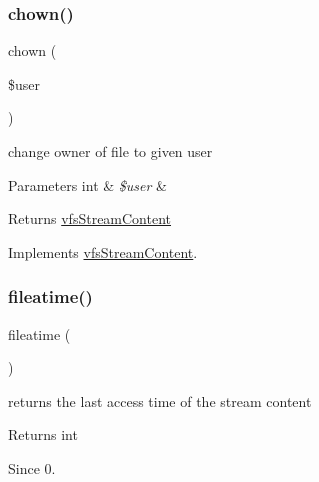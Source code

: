\subsubsection{\texorpdfstring{chown()}{chown()}}
{\footnotesize\ttfamily chown (\begin{DoxyParamCaption}\item[{}]{\$user }\end{DoxyParamCaption})}

change owner of file to given user


\begin{DoxyParams}[1]{Parameters}
int & {\em \$user} & \\
\hline
\end{DoxyParams}
\begin{DoxyReturn}{Returns}
\mbox{\hyperlink{interfaceorg_1_1bovigo_1_1vfs_1_1vfs_stream_content}{vfs\+Stream\+Content}} 
\end{DoxyReturn}


Implements \mbox{\hyperlink{interfaceorg_1_1bovigo_1_1vfs_1_1vfs_stream_content_adc7dd498252edfe9eef1bdb602edcbdb}{vfs\+Stream\+Content}}.

\mbox{\label{classorg_1_1bovigo_1_1vfs_1_1vfs_stream_abstract_content_a759a9858b5dea80fa68db2668df45ca0}} 
\subsubsection{\texorpdfstring{fileatime()}{fileatime()}}
{\footnotesize\ttfamily fileatime (\begin{DoxyParamCaption}{ }\end{DoxyParamCaption})}

returns the last access time of the stream content

\begin{DoxyReturn}{Returns}
int 
\end{DoxyReturn}
\begin{DoxySince}{Since}
0. 
\end{DoxySince}
\mbox{\label{classorg_1_1bovigo_1_1vfs_1_1vfs_stream_abstract_content_a2c61fdbe7cabe3e7ec79881084be2ba5}} 
